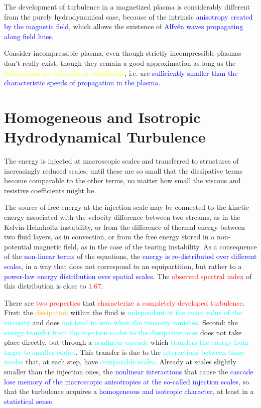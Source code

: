 \documentclass[12pt,a4paper]{article}
\begin{document}
The development of turbulence in a magnetized plasma is considerably different from the purely hydrodynamical case, because of the intrinsic \textcolor{blue}{anisotropy created by the magnetic field}, which allows the existence of \textcolor{blue}{Alfv\'en waves propagating along field lines}. 

Consider incompressible plasma, even though strictly incompressible plasmas don't really exist, though they remain a good approximation as long as the \textcolor{yellow}{fluctuations are subsonic or subalfv\'enic}, i.e. are \textcolor{blue}{sufficiently smaller than the characteristic speeds of propagation in the plasma}.
 
\section{Homogeneous and Isotropic Hydrodynamical Turbulence}
\cite{2015bps..book.....C} The energy is injected at macroscopic scales and transferred to structures of increasingly reduced scales, until these are so small that the dissipative terms become comparable to the other terms, no matter how small the viscous and resistive coefficients might be.

The source of free energy at the injection scale may be connected to the kinetic energy associated with the velocity difference between two streams, as in the Kelvin-Helmholtz instability, or from the difference of thermal energy between two fluid layers, as in convection, or from the free energy stored in a non-potential magnetic field, as in the case of the tearing instability. As a consequence of the \textcolor{blue}{non-linear terms} of the equations, the \textcolor{blue}{energy is re-distributed over different scales}, in a way that does not correspond to an equipartition, but rather to a \textcolor{blue}{power-law energy distribution over spatial scales}. The \textcolor{red}{observed spectral index} of this distribution is close to \textcolor{red}{$1.67$}.

There are \textcolor{red}{two properties} that \textcolor{red}{characterize a completely developed turbulence}. First: the \textcolor{orange}{dissipation} within the fluid is \textcolor{cyan}{independent of the exact value of the viscosity} and does \textcolor{cyan}{not tend to zero when the viscosity vanishes}. Second: the \textcolor{cyan}{energy transfer from the injection scales to the dissipative ones} does not take place directly, but through a \textcolor{cyan}{nonlinear cascade} which \textcolor{cyan}{transfers the energy from larger to smaller eddies}. This transfer is due to the \textcolor{cyan}{interactions between those modes} that, at each step, have \textcolor{cyan}{comparable scales}. Already at scales slightly smaller than the injection ones, the \textcolor{blue}{nonlinear interactions} that cause the \textcolor{blue}{cascade lose memory of the macroscopic anisotropies at the so-called injection scales}, so that the turbulence acquires a \textcolor{blue}{homogeneous and isotropic character}, at least in a \textcolor{blue}{statistical sense}.
\end{document}

